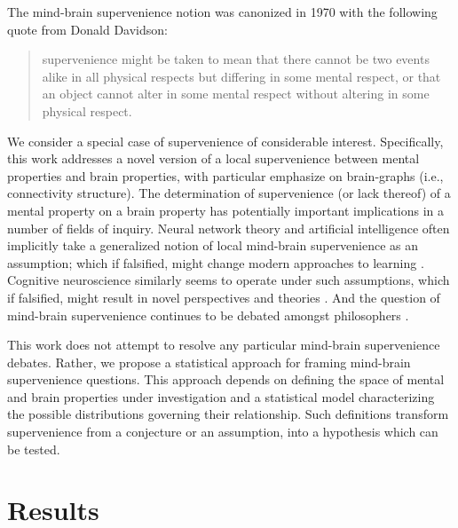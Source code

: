 \documentclass{article}
\begin{document}

\newpage

\noindent The mind-brain supervenience notion was canonized in 1970 with the following quote from Donald Davidson: \cite{Davidson70}
\begin{quotation}
 supervenience might be taken to mean that there cannot be two events alike in all physical respects but differing in some mental respect, or that an object cannot alter in some mental respect without altering in some physical respect.
\end{quotation}
We consider a special case of supervenience of considerable interest.  Specifically, this work addresses a novel version of a local supervenience between mental properties and brain properties, with particular emphasize on brain-graphs (i.e., connectivity structure).  The determination of supervenience (or lack thereof) of a mental property on a brain property has potentially important implications in a number of fields of inquiry.  Neural network theory and artificial intelligence often implicitly take a generalized notion of local mind-brain supervenience as an assumption; which if falsified, might change modern approaches to learning \cite{Haykin2008,Ripley2008}. Cognitive neuroscience similarly seems to operate under such assumptions, which if falsified, might result in novel perspectives and theories \cite{Fodor1998, Gazzaniga2008}.  And the question of mind-brain supervenience continues to be debated amongst philosophers \cite{Kim2007}.

This work does not attempt to resolve any particular mind-brain supervenience debates.  Rather, we propose a statistical approach for framing mind-brain supervenience questions.  This approach depends on defining the space of mental and brain properties under investigation and a statistical model characterizing the possible distributions governing their relationship.  Such definitions transform supervenience from a conjecture or an assumption, into a hypothesis which can be tested.



\section*{Results}
\end{document}
